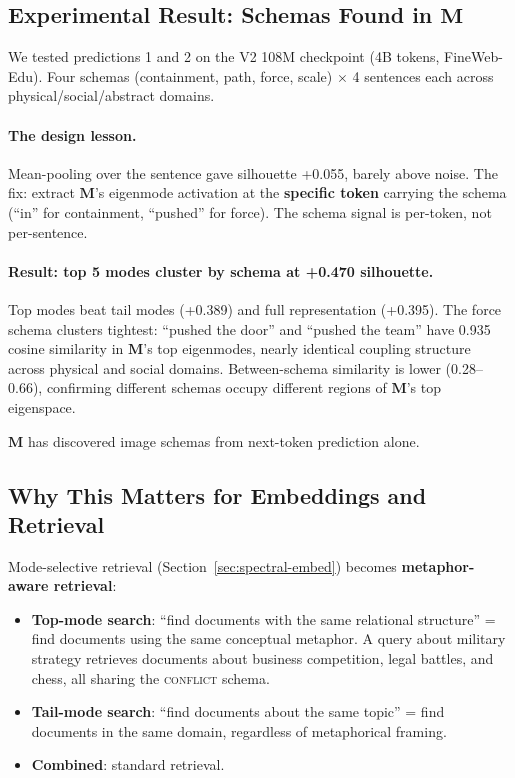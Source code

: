 \documentclass[11pt, a4paper]{article}
\newcommand{\M}{\mathbf{M}}
\theoremstyle{remark}
\begin{document}
\subsection{Experimental Result: Schemas Found in \texorpdfstring{$\M$}{M}}

We tested predictions 1 and 2 on the V2 108M checkpoint (4B tokens, FineWeb-Edu).
Four schemas (containment, path, force, scale) $\times$ 4 sentences each across physical/social/abstract domains.

\paragraph{The design lesson.}
Mean-pooling over the sentence gave silhouette +0.055, barely above noise.
The fix: extract $\M$'s eigenmode activation at the \textbf{specific token} carrying the schema (``in'' for containment, ``pushed'' for force).
The schema signal is per-token, not per-sentence.

\paragraph{Result: top 5 modes cluster by schema at +0.470 silhouette.}
Top modes beat tail modes (+0.389) and full representation (+0.395).
The force schema clusters tightest: ``pushed the door'' and ``pushed the team'' have 0.935 cosine similarity in $\M$'s top eigenmodes, nearly identical coupling structure across physical and social domains.
Between-schema similarity is lower (0.28--0.66), confirming different schemas occupy different regions of $\M$'s top eigenspace.

$\M$ has discovered image schemas from next-token prediction alone.

\subsection{Why This Matters for Embeddings and Retrieval}

Mode-selective retrieval (Section~\ref{sec:spectral-embed}) becomes \textbf{metaphor-aware retrieval}:

\begin{itemize}[nosep]
    \item \textbf{Top-mode search}: ``find documents with the same relational structure'' = find documents using the same conceptual metaphor.
    A query about military strategy retrieves documents about business competition, legal battles, and chess, all sharing the \textsc{conflict} schema.
    \item \textbf{Tail-mode search}: ``find documents about the same topic'' = find documents in the same domain, regardless of metaphorical framing.
    \item \textbf{Combined}: standard retrieval.
\end{itemize}
\end{document}
